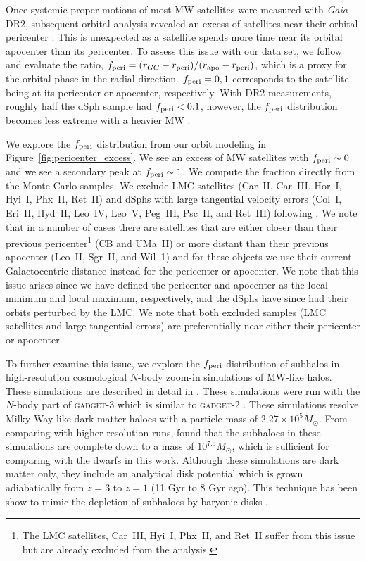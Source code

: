 \documentclass[twocolumn]{aastex63}
\begin{document}
Once systemic proper motions of most MW satellites were measured with {\it Gaia} DR2, subsequent orbital analysis revealed an excess of  satellites near their orbital pericenter  \citep{Simon2018ApJ...863...89S, Fritz2018A&A...619A.103F}. 
This is unexpected as a satellite spends more time near its orbital apocenter than its pericenter.
To assess this issue with our data set, we follow \citet{Fritz2018A&A...619A.103F} and evaluate the ratio, $f_{\rm peri}= (r_{GC} - r_{\rm peri} )/ (r_{\rm apo} - r_{\rm peri})$, which is a proxy for the orbital phase in the radial direction.
 $f_{\rm peri}=0,1$  corresponds to the satellite being at its pericenter or apocenter, respectively. 
With DR2 measurements, roughly half the dSph sample had $f_{\rm peri}<0.1$, however, the $f_{\rm peri}$ distribution becomes less extreme with  a heavier MW  \citep{Fritz2018A&A...619A.103F}.  


We explore the $f_{\rm peri}$ distribution from our orbit modeling in Figure~\ref{fig:pericenter_excess}.
We see an excess  of MW satellites with  $f_{\rm peri}\sim0$ and we see a secondary peak at $f_{\rm peri}\sim1$.
We compute the fraction directly from the Monte Carlo samples.
We exclude LMC satellites (Car~II, Car~III, Hor~I, Hyi~I, Phx~II, Ret~II) and dSphs with large tangential velocity errors (Col~I, Eri~II, Hyd~II, Leo~IV, Leo~V, Peg~III, Psc~II, and Ret~III) following  \citet{CorreaMagnus2022MNRAS.511.2610C}.
We note that in a number of cases there are satellites that are either closer than their previous pericenter\footnote{The LMC satellites, Car~III, Hyi~I, Phx~II, and Ret~II suffer from this issue but are already excluded from the analysis.} (CB and UMa~II)  or more distant than their previous apocenter (Leo~II, Sgr~II, and Wil~1) and for these objects we use their current Galactocentric distance instead for the pericenter or apocenter. We note that this issue arises since we have defined the pericenter and apocenter as the local minimum and local maximum, respectively, and the dSphs have since had their orbits perturbed by the LMC.
We note that both excluded samples (LMC satellites and large tangential errors) are preferentially near either their pericenter or apocenter.   


To further examine this issue, we explore the $f_{\rm peri}$ distribution of subhalos in high-resolution cosmological $N$-body zoom-in simulations of MW-like halos. These simulations are described in detail in \citet{Jethwa2018MNRAS.473.2060J}.
These simulations were run with the $N$-body part of \textsc{gadget-3} which is similar to \textsc{gadget-2} \citep{Springel2005MNRAS.364.1105S}. These simulations resolve Milky Way-like dark matter haloes with a particle mass of $2.27\times10^5 M_\odot$. From comparing with higher resolution runs, \citet{Jethwa2018MNRAS.473.2060J} found that the subhaloes in these simulations are complete down to a mass of $10^{7.5} M_\odot$, which is sufficient for comparing with the dwarfs in this work. Although these simulations are dark matter only, they include an analytical disk potential which is grown adiabatically from $z=3$ to $z=1$ (11 Gyr to 8 Gyr ago). This technique has been show to mimic the depletion of subhaloes by baryonic disks \citep[e.g.,][]{GarrisonKimmel2017MNRAS.471.1709G}.
\end{document}
